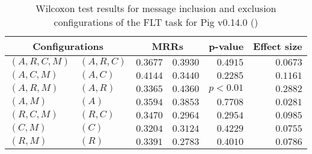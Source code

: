 
\begin{table}
\begin{spacing}{1.2}
\centering
\caption{Wilcoxon test results for message inclusion and exclusion configurations of the FLT task for Pig v0.14.0 (\ctwo)}
\label{table:versus-wilcox-pig-flt-message}
\begin{tabular}{ll|rr|rr}
\toprule
      \multicolumn{2}{c|}{Configurations} &                \multicolumn{2}{c|}{MRRs} &             p-value & Effect size \\
\midrule
 $(A,R,C,M)$ &  $(A,R,C)$ &       $0.3677$ &  $\bm{0.3930}$ & $0.4915$ &    $0.0673$ \\
   $(A,C,M)$ &    $(A,C)$ &  $\bm{0.4144}$ &       $0.3440$ & $0.2285$ &    $0.1161$ \\
   $(A,R,M)$ &    $(A,R)$ &       $0.3365$ &  $\bm{0.4360}$ & $p<0.01$ &    $0.2882$ \\
     $(A,M)$ &      $(A)$ &       $0.3594$ &  $\bm{0.3853}$ & $0.7708$ &    $0.0281$ \\
   $(R,C,M)$ &    $(R,C)$ &  $\bm{0.3470}$ &       $0.2964$ & $0.2954$ &    $0.0985$ \\
     $(C,M)$ &      $(C)$ &  $\bm{0.3204}$ &       $0.3124$ & $0.4229$ &    $0.0755$ \\
     $(R,M)$ &      $(R)$ &  $\bm{0.3391}$ &       $0.2783$ & $0.4010$ &    $0.0786$ \\
\bottomrule
\end{tabular}

\end{spacing}
\end{table}

